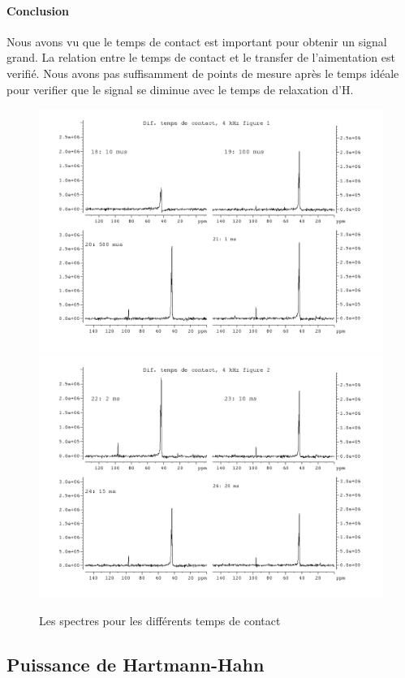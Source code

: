 \documentclass[a4paper,12pt]{scrartcl}
\begin{document}
   \paragraph{Conclusion}
    Nous avons vu que le temps de contact est important pour obtenir un signal grand. La relation entre le temps de contact et le transfer de l'aimentation est verifié. Nous avons pas suffisamment de points de mesure après le temps idéale pour verifier que le signal se diminue avec le temps de relaxation d'H.
\begin{figure}
    \includegraphics[width=\textwidth]{bilder/figure3.png}
    \includegraphics[width=\textwidth]{bilder/figure4.png}
    \caption{\label{temps} Les spectres pour les différents temps de contact}
   \end{figure}
  \subsection{Puissance de Hartmann-Hahn}
\end{document}
